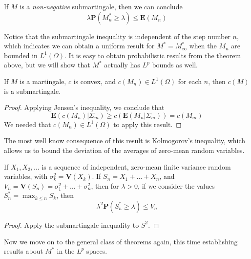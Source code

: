 \begin{corollary}
    If $M$ is a {\it non-negative} submartingale, then we can conclude
    \[ \lambda \mathbf{P} \left( M^*_n \geq \lambda \right) \leq \mathbf{E}(M_n) \]
\end{corollary}

Notice that the submartingale inequality is independent of the step number $n$, which indicates we can obtain a uniform result for $M^* = M^*_\infty$ when the $M_n$ are bounded in $L^1(\Omega)$. It is easy to obtain probabilistic results from the theorem above, but we will show that $M^*$ actually has $L^p$ bounds as well.

\begin{lemma}
    If $M$ is a martingale, $c$ is convex, and $c(M_n) \in L^1(\Omega)$ for each $n$, then $c(M)$ is a submartingale.
\end{lemma}
\begin{proof}
    Applying Jensen's inequality, we conclude that
    \[ \mathbf{E}(c(M_n)|\Sigma_m) \geq c(\mathbf{E}(M_n|\Sigma_m)) = c(M_m) \]
    We needed that $c(M_n) \in L^1(\Omega)$ to apply this result.
\end{proof}

The most well know consequence of this result is Kolmogorov's inequality, which allows us to bound the deviation of the averages of zero-mean random variables.

\begin{corollary}
    If $X_1, X_2, \dots$ is a sequence of independent, zero-mean finite variance random variables, with $\sigma_k^2 = \mathbf{V}(X_k)$. If $S_n = X_1 + \dots + X_n$, and $V_n = \mathbf{V}(S_n) = \sigma_1^2 + \dots + \sigma_n^2$, then for $\lambda > 0$, if we consider the values $S^*_n = \max_{k \leq n} S_k$, then
    \[ \lambda^2 \mathbf{P} \left( S^*_n \geq \lambda \right) \leq V_n \]
\end{corollary}
\begin{proof}
    Apply the submartingale inequality to $S^2$.
\end{proof}

Now we move on to the general class of theorems again, this time establishing results about $M^*$ in the $L^p$ spaces.

